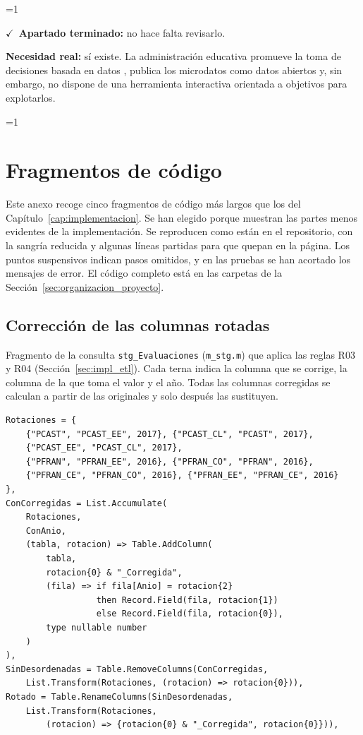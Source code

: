 \documentclass[12pt, a4paper, oneside]{report}
\newcommand{\mostrarterminados}{1}
\newenvironment{revisado}
  {\ifnum\mostrarterminados=1\relax\begin{cajarevisada}\noindent\colorbox{verdeterminado}{\parbox{\dimexpr\linewidth-2\fboxsep\relax}{\small$\checkmark$\ \textbf{Apartado terminado:} no hace falta revisarlo.}}\par\medskip\fi}
  {\ifnum\mostrarterminados=1\relax\end{cajarevisada}\fi}
\begin{document}
\begin{revisado}
\textbf{Necesidad real:} sí existe. La administración educativa promueve la toma de decisiones basada en datos \cite{mandinach2012data}, publica los microdatos como datos abiertos y, sin embargo, no dispone de una herramienta interactiva orientada a objetivos para explotarlos.

\end{revisado}




\appendix
\chapter{Fragmentos de código}
\label{anexo:codigo}
Este anexo recoge cinco fragmentos de código más largos que los del Capítulo~\ref{cap:implementacion}. Se han elegido porque muestran las partes menos evidentes de la implementación. Se reproducen como están en el repositorio, con la sangría reducida y algunas líneas partidas para que quepan en la página. Los puntos suspensivos indican pasos omitidos, y en las pruebas se han acortado los mensajes de error. El código completo está en las carpetas de la Sección~\ref{sec:organizacion_proyecto}.

\section{Corrección de las columnas rotadas}
Fragmento de la consulta \texttt{stg\_Evaluaciones} (\texttt{m\_stg.m}) que aplica las reglas R03 y R04 (Sección~\ref{sec:impl_etl}). Cada terna indica la columna que se corrige, la columna de la que toma el valor y el año. Todas las columnas corregidas se calculan a partir de las originales y solo después las sustituyen.

\begingroup\footnotesize{}
\begin{verbatim}
Rotaciones = {
    {"PCAST", "PCAST_EE", 2017}, {"PCAST_CL", "PCAST", 2017},
    {"PCAST_EE", "PCAST_CL", 2017},
    {"PFRAN", "PFRAN_EE", 2016}, {"PFRAN_CO", "PFRAN", 2016},
    {"PFRAN_CE", "PFRAN_CO", 2016}, {"PFRAN_EE", "PFRAN_CE", 2016}
},
ConCorregidas = List.Accumulate(
    Rotaciones,
    ConAnio,
    (tabla, rotacion) => Table.AddColumn(
        tabla,
        rotacion{0} & "_Corregida",
        (fila) => if fila[Anio] = rotacion{2}
                  then Record.Field(fila, rotacion{1})
                  else Record.Field(fila, rotacion{0}),
        type nullable number
    )
),
SinDesordenadas = Table.RemoveColumns(ConCorregidas,
    List.Transform(Rotaciones, (rotacion) => rotacion{0})),
Rotado = Table.RenameColumns(SinDesordenadas,
    List.Transform(Rotaciones,
        (rotacion) => {rotacion{0} & "_Corregida", rotacion{0}})),
\end{verbatim}
\endgroup
\end{document}
